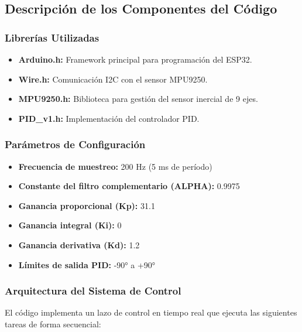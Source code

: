 \documentclass[12pt,letterpaper]{report}
\begin{document}
\subsection*{Descripción de los Componentes del Código}

\subsubsection*{Librerías Utilizadas}

\begin{itemize}
    \item \textbf{Arduino.h:} Framework principal para programación del ESP32.
    \item \textbf{Wire.h:} Comunicación I2C con el sensor MPU9250.
    \item \textbf{MPU9250.h:} Biblioteca para gestión del sensor inercial de 9 ejes.
    \item \textbf{PID\_v1.h:} Implementación del controlador PID.
\end{itemize}

\subsubsection*{Parámetros de Configuración}

\begin{itemize}
    \item \textbf{Frecuencia de muestreo:} 200 Hz (5 ms de período)
    \item \textbf{Constante del filtro complementario (ALPHA):} 0.9975
    \item \textbf{Ganancia proporcional (Kp):} 31.1
    \item \textbf{Ganancia integral (Ki):} 0
    \item \textbf{Ganancia derivativa (Kd):} 1.2
    \item \textbf{Límites de salida PID:} -90° a +90°
\end{itemize}

\subsubsection*{Arquitectura del Sistema de Control}

El código implementa un lazo de control en tiempo real que ejecuta las siguientes tareas de forma secuencial:
\end{document}
